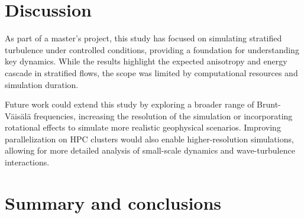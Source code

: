 \documentclass[final,5p,times,twocolumn,authoryear]{elsarticle}
\begin{document}
\section{Discussion}

As part of a master’s project, this study has focused on simulating stratified turbulence under controlled conditions, providing a foundation for understanding key dynamics. While the results highlight the expected anisotropy and energy cascade in stratified flows, the scope was limited by computational resources and simulation duration. 

Future work could extend this study by exploring a broader range of Brunt-Väisälä frequencies, increasing the resolution of the simulation or incorporating rotational effects to simulate more realistic geophysical scenarios. Improving parallelization on HPC clusters would also enable higher-resolution simulations, allowing for more detailed analysis of small-scale dynamics and wave-turbulence interactions.

\section{Summary and conclusions}

 

\end{document}
